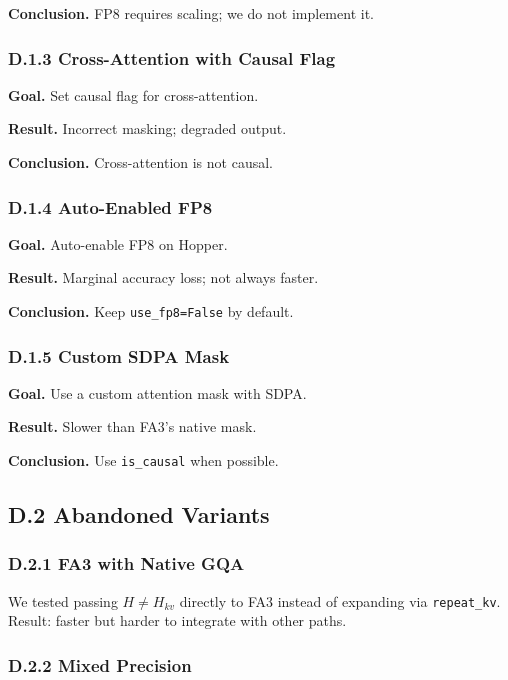 \textbf{Conclusion.} FP8 requires scaling; we do not implement it.

\subsubsection{D.1.3 Cross-Attention with Causal Flag}

\textbf{Goal.} Set causal flag for cross-attention.

\textbf{Result.} Incorrect masking; degraded output.

\textbf{Conclusion.} Cross-attention is not causal.

\subsubsection{D.1.4 Auto-Enabled FP8}

\textbf{Goal.} Auto-enable FP8 on Hopper.

\textbf{Result.} Marginal accuracy loss; not always faster.

\textbf{Conclusion.} Keep \texttt{use\_fp8=False} by default.

\subsubsection{D.1.5 Custom SDPA Mask}

\textbf{Goal.} Use a custom attention mask with SDPA.

\textbf{Result.} Slower than FA3's native mask.

\textbf{Conclusion.} Use \texttt{is\_causal} when possible.

\subsection{D.2 Abandoned Variants}

\subsubsection{D.2.1 FA3 with Native GQA}

We tested passing $H \neq H_{kv}$ directly to FA3 instead of expanding via 
\texttt{repeat\_kv}. Result: faster but harder to integrate with other paths.

\subsubsection{D.2.2 Mixed Precision}

